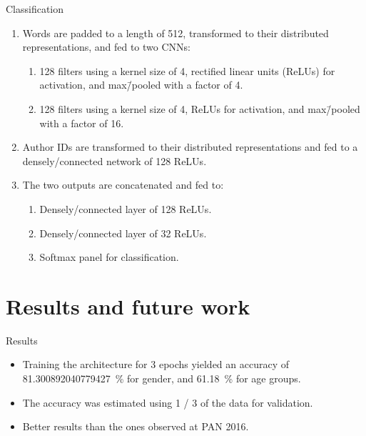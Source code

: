 \documentclass[xcolor={svgnames, table}, usepdftitle=false]{beamer}
\begin{document}
\begin{frame}{Classification}
  \begin{enumerate}
  \item Words are padded to a length of \num{512}, transformed to
    their distributed representations, and fed to two CNNs:
    \begin{enumerate}
    \item \num{128} filters using a kernel size of \num{4}, rectified
      linear units (ReLUs) for activation, and max\=/pooled with a
      factor of \num{4}.
    \item \num{128} filters using a kernel size of \num{4}, ReLUs for
      activation, and max\=/pooled with a factor of \num{16}.
    \end{enumerate}
  \item Author IDs are transformed to their distributed
    representations and fed to a densely\-/connected network of
    \num{128} ReLUs.
  \item The two outputs are concatenated and fed to:
    \begin{enumerate}
    \item Densely\-/connected layer of \num{128} ReLUs.
    \item Densely\-/connected layer of \num{32} ReLUs.
    \item Softmax panel for classification.
    \end{enumerate}
  \end{enumerate}
\end{frame}

\section{Results and future work}

\begin{frame}{Results}
  \begin{itemize}
  \item Training the architecture for \num{3} epochs yielded an
    accuracy of \SI[round-mode=places,
    round-precision=2]{81.300892040779427}{\percent} for gender, and
    \SI[round-mode=places, round-precision=2]{61.18}{\percent} for age
    groups.
  \item The accuracy was estimated using \num{1 / 3} of the data for
    validation.
  \item Better results than the ones observed at PAN 2016.
  \end{itemize}
\end{frame}
\end{document}
